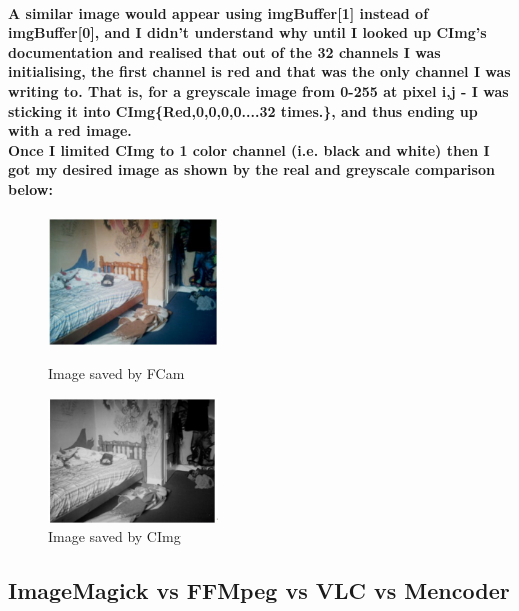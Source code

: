 \documentclass[11pt]{article} %
\begin{document}
\paragraph{
A similar image would appear using imgBuffer[1] instead of imgBuffer[0], and I didn't understand why until I looked up CImg's documentation and realised that out of the 32 channels I was initialising, the first channel is red and that was the only channel I was writing to.
That is, for a greyscale image from 0-255 at pixel i,j - I was sticking it into CImg\{Red,0,0,0,0....32 times.\}, and thus ending up with a red image.
\\Once I limited CImg to 1 color channel (i.e. black and white) then I got my desired image as shown by the real and greyscale comparison below:
}
\begin{figure}
	\vspace{-20pt}
	\begin{center}
		\includegraphics[width=0.4\textwidth]{../images/realbuffer2}
	\end{center}
	\vspace{-20pt}
	\caption{Image saved by FCam}
	\vspace{0pt}
	\begin{center}
		\includegraphics[width=0.4\textwidth]{../images/blackbuffer3}
	\end{center}
	\vspace{-20pt}
	\caption{Image saved by CImg}
	\vspace{-40pt}
\end{figure}

\subsection{ImageMagick vs FFMpeg vs VLC vs Mencoder}
\end{document}
